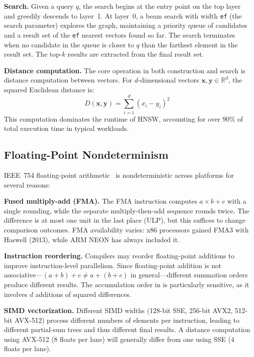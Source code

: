 \documentclass[10pt,journal,compsoc]{IEEEtran}
\newcommand{\hnsw}{\textsc{HNSW}}
\begin{document}
\textbf{Search.} Given a query $q$, the search begins at the entry point on the top layer and greedily descends to layer~1. At layer~0, a beam search with width \texttt{ef} (the search parameter) explores the graph, maintaining a priority queue of candidates and a result set of the \texttt{ef} nearest vectors found so far. The search terminates when no candidate in the queue is closer to $q$ than the farthest element in the result set. The top-$k$ results are extracted from the final result set.

\textbf{Distance computation.} The core operation in both construction and search is distance computation between vectors. For $d$-dimensional vectors $\mathbf{x}, \mathbf{y} \in \mathbb{R}^d$, the squared Euclidean distance is:
\begin{equation}
  \label{eq:l2dist}
  D(\mathbf{x}, \mathbf{y}) = \sum_{i=1}^{d} (x_i - y_i)^2
\end{equation}
This computation dominates the runtime of \hnsw{}, accounting for over 90\% of total execution time in typical workloads.

\subsection{Floating-Point Nondeterminism}
\label{sec:fp_nondet}

IEEE~754 floating-point arithmetic~\cite{goldberg1991float} is nondeterministic across platforms for several reasons:

\textbf{Fused multiply-add (FMA).} The FMA instruction computes $a \times b + c$ with a single rounding, while the separate multiply-then-add sequence rounds twice. The difference is at most one unit in the last place (ULP), but this suffices to change comparison outcomes. FMA availability varies: x86 processors gained FMA3 with Haswell (2013), while ARM NEON has always included it.

\textbf{Instruction reordering.} Compilers may reorder floating-point additions to improve instruction-level parallelism. Since floating-point addition is not associative---$(a + b) + c \neq a + (b + c)$ in general---different summation orders produce different results. The accumulation order in  is particularly sensitive, as it involves $d$ additions of squared differences.

\textbf{SIMD vectorization.} Different SIMD widths (128-bit SSE, 256-bit AVX2, 512-bit AVX-512) process different numbers of elements per instruction, leading to different partial-sum trees and thus different final results. A distance computation using AVX-512 (8 floats per lane) will generally differ from one using SSE (4 floats per lane).
\end{document}
